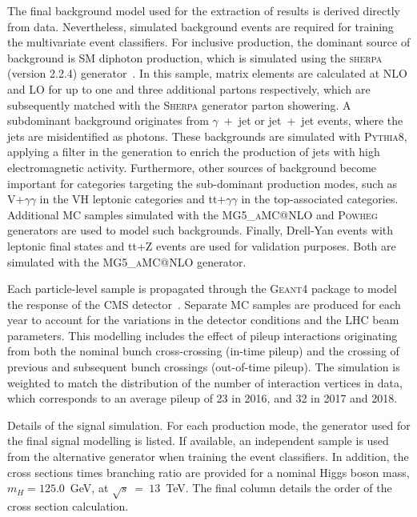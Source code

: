 The final background model used for the extraction of results is derived directly from data. Nevertheless, simulated background events are required for training the multivariate event classifiers. For inclusive production, the dominant source of background is SM diphoton production, which is simulated using the \textsc{sherpa} (version 2.2.4) generator~\cite{Gleisberg:2008ta}. In this sample, matrix elements are calculated at NLO and LO for up to one and three additional partons respectively, which are subsequently matched with the \textsc{Sherpa} generator parton showering. A subdominant background originates from $\gamma$~+~jet or jet~+~jet events, where the jets are misidentified as photons. These backgrounds are simulated with \textsc{Pythia8}, applying a filter in the generation to enrich the production of jets with high electromagnetic activity. Furthermore, other sources of background become important for categories targeting the sub-dominant production modes, such as V+$\gamma\gamma$ in the VH leptonic categories and tt+$\gamma\gamma$ in the top-associated categories. Additional MC samples simulated with the \textsc{MG5\_aMC@NLO} and \textsc{Powheg} generators are used to model such backgrounds. Finally, Drell-Yan events with leptonic final states and tt+Z events are used for validation purposes. Both are simulated with the \textsc{MG5\_aMC@NLO} generator.

Each particle-level sample is propagated through the \textsc{Geant4} package to model the response of the CMS detector~\cite{Agostinelli:2002hh}. Separate MC samples are produced for each year to account for the variations in the detector conditions and the LHC beam parameters. This modelling includes the effect of pileup interactions originating from both the nominal bunch cross-crossing (in-time pileup) and the crossing of previous and subsequent bunch crossings (out-of-time pileup). The simulation is weighted to match the distribution of the number of interaction vertices in data, which corresponds to an average pileup of 23 in 2016, and 32 in 2017 and 2018.

\begin{table}[htb!]
    \caption[Signal simulation details]{Details of the signal simulation. For each production mode, the generator used for the final signal modelling is listed. If available, an independent sample is used from the alternative generator when training the event classifiers. In addition, the cross sections times branching ratio are provided for a nominal Higgs boson mass, $m_H=125.0$~GeV, at $\sqrt{s}~=~13$~TeV. The final column details the order of the cross section calculation.}
    \label{tab:signal_samples}
    \centering
    \scriptsize
    \hspace*{-5cm}
    \renewcommand{\arraystretch}{2}
    \setlength{\tabcolsep}{5pt}
    
    \hspace*{-5cm}
\end{table}



